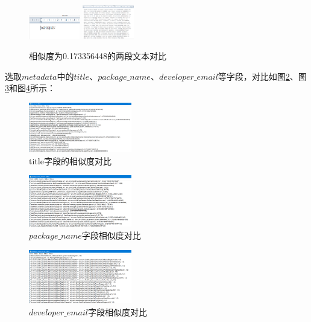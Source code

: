 \documentclass[UTF8,a4paper,10pt, twocolumn]{ctexart}
\begin{document}
\begin{figure}[htbp]
  \centering
  \includegraphics[width=0.2\textwidth]{img/fig3.png}
  \includegraphics[width=0.2\textwidth]{img/fig4.png}
  \caption{相似度为0.173356448的两段文本对比}
  \label{figure:zju2}
  \end{figure}

选取$metadata$中的$title$、$package\_name$、$developer\_email$等字段，对比如图\ref{figure:zju3}、图\ref{figure:zju4}和图\ref{figure:zju5}所示：

\begin{figure}[htbp]
  \centering
  \includegraphics[width=0.4\textwidth]{img/fig5.png}
  \caption{title字段的相似度对比}
  \label{figure:zju3}
  \end{figure}

\begin{figure}[htbp]
  \centering
  \includegraphics[width=0.4\textwidth]{img/fig6.png}
  \caption{$package\_name$字段相似度对比}
  \label{figure:zju4}
  \end{figure}

\begin{figure}[htbp]
  \centering
  \includegraphics[width=0.4\textwidth]{img/fig7.png}
  \caption{$developer\_email$字段相似度对比}
  \label{figure:zju5}
  \end{figure}
\end{document}
